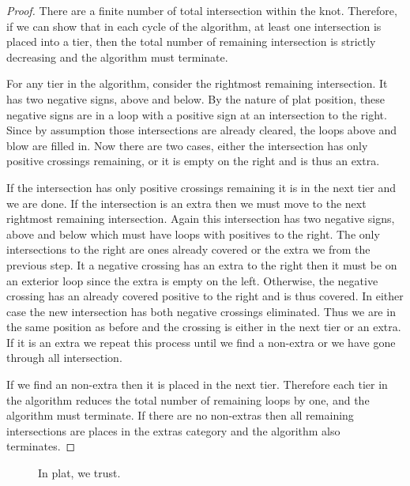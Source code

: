 \documentclass[11pt,oneside]{amsart}
\begin{document}
\begin{proof}
    There are a finite number of total intersection within the knot. Therefore, if we can show that in each cycle of the algorithm, at least one intersection is placed into a tier, then the total number of remaining intersection is strictly decreasing and the algorithm must terminate.

    For any tier in the algorithm, consider the rightmost remaining intersection. It has two negative signs, above and below. By the nature of plat position, these negative signs are in a loop with a positive sign at an intersection to the right. Since by assumption those intersections are already cleared, the loops above and blow are filled in. Now there are two cases, either the intersection has only positive crossings remaining, or it is empty on the right and is thus an extra.

    If the intersection has only positive crossings remaining it is in the next tier and we are done. If the intersection is an extra then we must move to the next rightmost remaining intersection. Again this intersection has two negative signs, above and below which must have loops with positives to the right. The only intersections to the right are ones already covered or the extra we from the previous step. It a negative crossing has an extra to the right then it must be on an exterior loop since the extra is empty on the left. Otherwise, the negative crossing has an already covered positive to the right and is thus covered. In either case the new intersection has both negative crossings eliminated. Thus we are in the same position as before and the crossing is either in the next tier or an extra. If it is an extra we repeat this process until we find a non-extra or we have gone through all intersection.

    If we find an non-extra then it is placed in the next tier. Therefore each tier in the algorithm reduces the total number of remaining loops by one, and the algorithm must terminate. If there are no non-extras then all remaining intersections are places in the extras category and the algorithm also terminates. 
\end{proof}

\begin{figure}[htbp]
  \label{fig:PlatProof}
  \centering
  
  \caption{In plat, we trust.}
\end{figure}
\end{document}
